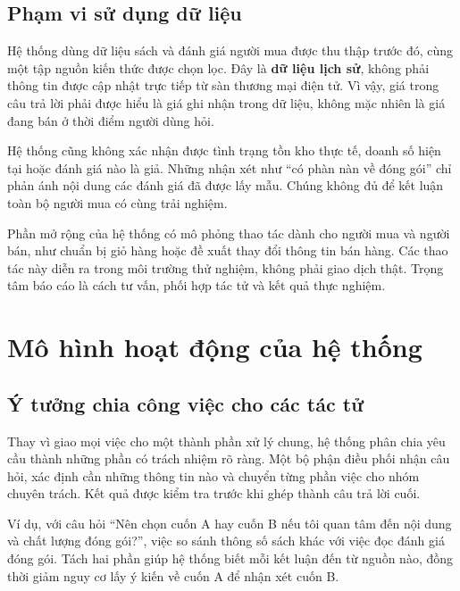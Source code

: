 \subsection{Phạm vi sử dụng dữ liệu}
Hệ thống dùng dữ liệu sách và đánh giá người mua được thu thập trước đó, cùng một tập nguồn kiến thức được chọn lọc. Đây là \textbf{dữ liệu lịch sử}, không phải thông tin được cập nhật trực tiếp từ sàn thương mại điện tử. Vì vậy, giá trong câu trả lời phải được hiểu là giá ghi nhận trong dữ liệu, không mặc nhiên là giá đang bán ở thời điểm người dùng hỏi. 

Hệ thống cũng không xác nhận được tình trạng tồn kho thực tế, doanh số hiện tại hoặc đánh giá nào là giả. Những nhận xét như ``có phàn nàn về đóng gói'' chỉ phản ánh nội dung các đánh giá đã được lấy mẫu. Chúng không đủ để kết luận toàn bộ người mua có cùng trải nghiệm.

Phần mở rộng của hệ thống có mô phỏng thao tác dành cho người mua và người bán, như chuẩn bị giỏ hàng hoặc đề xuất thay đổi thông tin bán hàng. Các thao tác này diễn ra trong môi trường thử nghiệm, không phải giao dịch thật. Trọng tâm báo cáo là cách tư vấn, phối hợp tác tử và kết quả thực nghiệm.

\section{Mô hình hoạt động của hệ thống}

\subsection{Ý tưởng chia công việc cho các tác tử}
Thay vì giao mọi việc cho một thành phần xử lý chung, hệ thống phân chia yêu cầu thành những phần có trách nhiệm rõ ràng. Một bộ phận điều phối nhận câu hỏi, xác định cần những thông tin nào và chuyển từng phần việc cho nhóm chuyên trách. Kết quả được kiểm tra trước khi ghép thành câu trả lời cuối. 

Ví dụ, với câu hỏi ``Nên chọn cuốn A hay cuốn B nếu tôi quan tâm đến nội dung và chất lượng đóng gói?'', việc so sánh thông số sách khác với việc đọc đánh giá đóng gói. Tách hai phần giúp hệ thống biết mỗi kết luận đến từ nguồn nào, đồng thời giảm nguy cơ lấy ý kiến về cuốn A để nhận xét cuốn B.

